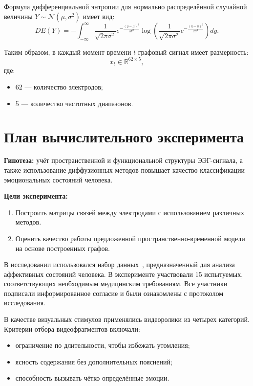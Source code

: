 \documentclass[12pt, twoside]{article}
\begin{document}
Формула дифференциальной энтропии для нормально распределённой случайной величины $Y \sim \mathcal{N}(\mu, \sigma^2)$ имеет вид:
\begin{equation}
DE(Y) = -\int_{-\infty}^{\infty} \frac{1}{\sqrt{2\pi\sigma^2}} e^{-\frac{(y - \mu)^2}{2\sigma^2}} \log \left( \frac{1}{\sqrt{2\pi\sigma^2}} e^{-\frac{(y - \mu)^2}{2\sigma^2}} \right) dy.
\end{equation}

Таким образом, в каждый момент времени $t$ графовый сигнал имеет размерность:
\[
x_t \in \mathbb{R}^{62 \times 5},
\]
где:
\begin{itemize}
    \item 62 — количество электродов;
    \item 5 — количество частотных диапазонов.
\end{itemize}

\section{План вычислительного эксперимента}

\textbf{Гипотеза:} учёт пространственной и функциональной структуры ЭЭГ-сигнала, а также использование диффузионных методов повышает качество классификации эмоциональных состояний человека.

\textbf{Цели эксперимента:}
\begin{enumerate}
    \item Построить матрицы связей между электродами с использованием различных методов.
    \item Оценить качество работы предложенной пространственно-временной модели на основе построенных графов.
\end{enumerate}

В исследовании использовался набор данных~\cite{Dataset}, предназначенный для анализа аффективных состояний человека. В эксперименте участвовали 15 испытуемых, соответствующих необходимым медицинским требованиям. Все участники подписали информированное согласие и были ознакомлены с протоколом исследования.

В качестве визуальных стимулов применялись видеоролики из четырех категорий. Критерии отбора видеофрагментов включали:
\begin{itemize}
    \item ограничение по длительности, чтобы избежать утомления;
    \item ясность содержания без дополнительных пояснений;
    \item способность вызывать чётко определённые эмоции.
\end{itemize}
\end{document}

